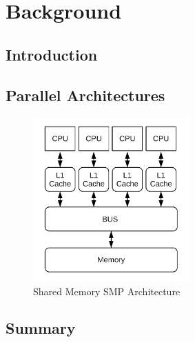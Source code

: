 \chapter{Background}
\label{ch:Background}

\section{Introduction}




\section{Parallel Architectures}

\begin{figure}[H]
\begin{center}
 \includegraphics [width=6cm]{Background/Figures/shared-memory-SMP.pdf}
 \caption{Shared Memory SMP Architecture}
 \label{fig:shared-memory-SMP}
\end{center}
\end{figure}

\section{Summary}




